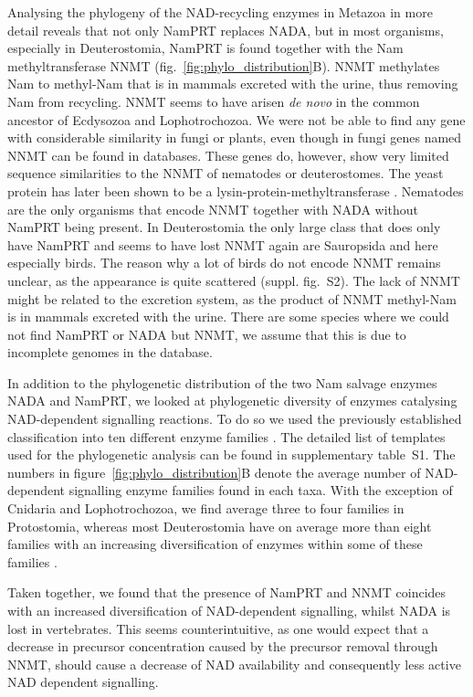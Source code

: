 Analysing the phylogeny of the NAD-recycling enzymes in Metazoa in more detail reveals that not only NamPRT replaces NADA, but in most organisms, especially in Deuterostomia, NamPRT is found together with the Nam methyltransferase NNMT (fig.~\ref{fig:phylo_distribution}B). NNMT methylates Nam to methyl-Nam that is in mammals excreted with the urine, thus removing Nam from recycling. NNMT seems to have arisen \textit{de novo} in the common ancestor of Ecdysozoa and Lophotrochozoa. We were not be able to find any gene with considerable similarity in fungi or plants, even though in fungi genes named NNMT can be found in databases. These genes do, however, show very limited sequence similarities to the NNMT of nematodes or deuterostomes. The yeast protein has later been shown to be a lysin-protein-methyltransferase \cite{Wlodarski2011}. Nematodes are the only organisms that encode NNMT together with NADA without NamPRT being present. In Deuterostomia the only large class that does only have NamPRT and seems to have lost NNMT again are Sauropsida and here especially birds. The reason why a lot of birds do not encode NNMT remains unclear, as the appearance is quite scattered (suppl. fig.~S2). The lack of NNMT might be related to the excretion system, as the product of NNMT methyl-Nam is in mammals excreted with the urine. There are some species where we could not find NamPRT or NADA but NNMT, we assume that this is due to incomplete genomes in the database.

In addition to the phylogenetic distribution of the two Nam salvage enzymes NADA and NamPRT, we looked at phylogenetic diversity of enzymes catalysing NAD-dependent signalling reactions. To do so we used the previously established classification into ten different enzyme families \cite{Gossmann2012FEBS}. The detailed list of templates used for the phylogenetic analysis can be found in supplementary table~S1. The numbers in figure~\ref{fig:phylo_distribution}B denote the average number of NAD-dependent signalling enzyme families found in each taxa. With the exception of Cnidaria and Lophotrochozoa, we find average three to four families in Protostomia, whereas most Deuterostomia have on average more than eight families with an increasing diversification of enzymes within some of these families \cite{Gossmann2014DNAR}.

Taken together, we found that the presence of NamPRT and NNMT coincides with an increased diversification of NAD-dependent signalling, whilst NADA is lost in vertebrates. This seems counterintuitive, as one would expect that a decrease in precursor concentration caused by the precursor removal through NNMT, should cause a decrease of NAD availability and consequently less active NAD dependent signalling.


